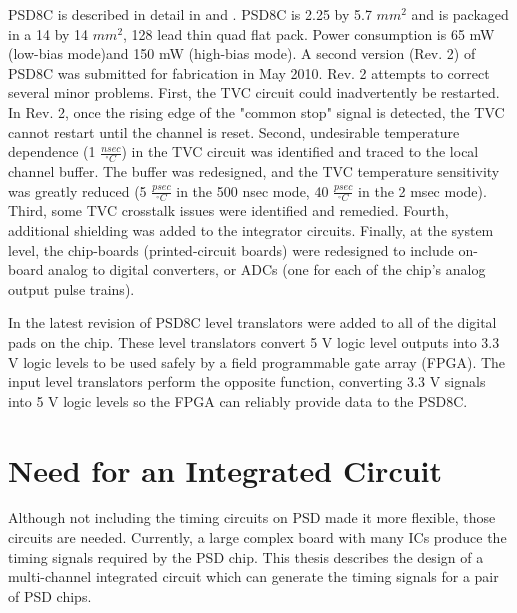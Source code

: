 \documentclass[12pt,oneside,final]{siuethesis}
\theoremstyle{definition}
\begin{document}
PSD8C is described in detail in \cite{PROCTOR} and \cite{HALL}. PSD8C is 2.25 by 5.7 $mm^2$ and is packaged in a 14 by 14 $mm^2$, 128 lead thin quad flat pack. Power consumption is 65 mW (low-bias mode)and 150 mW (high-bias mode).
A second version (Rev. 2) of PSD8C was submitted for fabrication in May 2010. Rev. 2 attempts to correct several minor
problems. First, the TVC circuit could inadvertently be restarted. In Rev. 2, once the rising edge of the "common stop" signal is detected, the TVC cannot restart until the channel is reset. Second, undesirable temperature dependence (1 $\frac{nsec}{^{\circ}C}$) in the TVC circuit was identified and traced to the local channel buffer. The buffer was redesigned, and the TVC temperature sensitivity was greatly reduced (5 $\frac{psec}{^{\circ}C}$ in the 500 nsec mode, 40 $\frac{psec}{^{\circ}C}$ in the 2 msec mode). Third, some TVC crosstalk issues were identified and remedied. Fourth, additional shielding was added to the integrator circuits. Finally, at the system level, the chip-boards (printed-circuit boards) were redesigned to include on-board analog to digital converters, or ADCs (one for each of the chip's analog output pulse trains).
\par In the latest revision of PSD8C level translators were added to all of the digital pads on the chip. These level translators convert 5 V logic level outputs into 3.3 V logic levels to be used safely by a field programmable gate array (FPGA). The input level translators perform the opposite function, converting 3.3 V signals into 5 V logic levels so the FPGA can reliably provide data to the PSD8C.

\section{Need for an Integrated Circuit}

Although not including the timing circuits on PSD made it more flexible, those circuits are needed.  Currently, a large complex board with many ICs produce the timing signals required by the PSD chip. This thesis describes the design of a multi-channel integrated circuit which can generate the timing signals for a pair of PSD chips.
\end{document}
